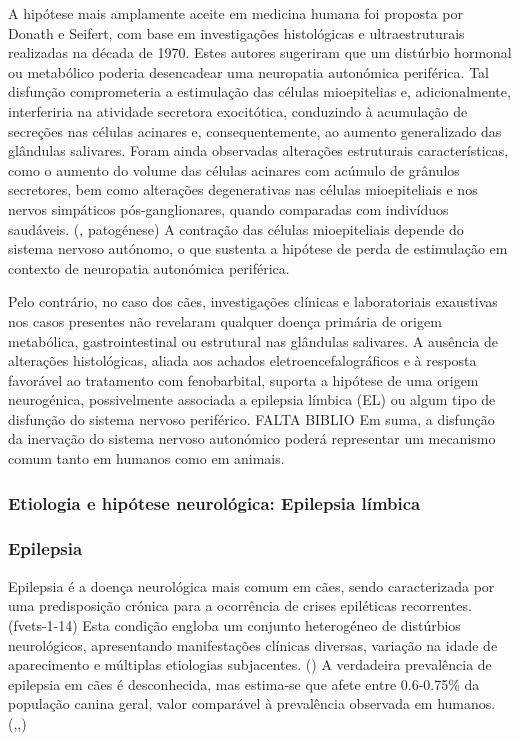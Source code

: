  A hipótese mais amplamente aceite em medicina humana foi proposta por Donath e Seifert, com base em investigações histológicas e ultraestruturais realizadas na década de 1970. Estes autores sugeriram que um distúrbio hormonal ou metabólico poderia desencadear uma neuropatia autonómica periférica. \cite{Davis2021} Tal disfunção comprometeria a estimulação das células mioepitelias e, adicionalmente, interferiria na atividade secretora exocitótica, conduzindo à acumulação de secreções nas células acinares e, consequentemente, ao aumento generalizado das glândulas salivares. \cite{Ihrler2010} Foram ainda observadas alterações estruturais características, como o aumento do volume das células acinares com acúmulo de grânulos secretores, bem como alterações degenerativas nas células mioepiteliais e nos nervos simpáticos pós-ganglionares, quando comparadas com indivíduos saudáveis. (\cite{davis2021}, patogénese) A contração das células mioepiteliais depende do sistema nervoso autónomo, o que sustenta a hipótese de perda de estimulação em contexto de neuropatia autonómica periférica. \cite{Ihrler2010}


Pelo contrário, no caso dos cães, investigações clínicas e laboratoriais exaustivas nos casos presentes não revelaram qualquer doença primária de origem metabólica, gastrointestinal ou estrutural nas glândulas salivares. A ausência de alterações histológicas, aliada aos achados eletroencefalográficos e à resposta favorável ao tratamento com fenobarbital, suporta a hipótese de uma origem neurogénica, possivelmente associada a epilepsia límbica (EL) ou algum tipo de disfunção do sistema nervoso periférico. FALTA BIBLIO
Em suma, a disfunção da inervação do sistema nervoso autonómico poderá representar um mecanismo comum tanto em humanos como em animais. \cite{Alcoverro2014}


\subsubsection{Etiologia e hipótese neurológica: Epilepsia límbica}

\subsubsection{Epilepsia}

Epilepsia é a doença neurológica mais comum em cães, sendo caracterizada por uma predisposição crónica para a ocorrência de crises epiléticas recorrentes. (fvets-1-14) Esta condição engloba um conjunto heterogéneo de distúrbios neurológicos, apresentando manifestações clínicas diversas, variação na idade de aparecimento e múltiplas etiologias subjacentes. (\cite{fvets-09}) 
A verdadeira prevalência de epilepsia em cães é desconhecida, mas estima-se que afete entre 0.6-0.75\% da população canina geral, valor comparável à prevalência observada em humanos. (\cite{1-s2},\cite{Packer2015},\cite{fvets-09})


